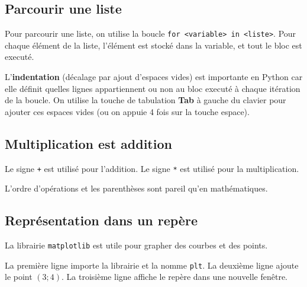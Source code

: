 \subsection*{Parcourir une liste}

\begin{multicols}{2}
	Pour parcourir une liste, on utilise la boucle \texttt{for <variable> in <liste>}.
	Pour chaque élément de la liste, l'élément est stocké dans la variable, et tout le bloc est executé.
	
	\columnbreak
	\centering
	\begin{minipage}{.3\textwidth}
	\end{minipage}
\end{multicols}

L'\textbf{indentation} (décalage par ajout d'espaces vides) est importante en Python car elle définit quelles lignes appartiennent ou non au bloc executé à chaque itération de la boucle.
On utilise la touche de tabulation \textbf{Tab} à gauche du clavier pour ajouter ces espaces vides (ou on appuie 4 fois sur la touche espace).

\subsection*{Multiplication est addition}

\begin{multicols}{2}
	Le signe \texttt{+} est utilisé pour l'addition.
	Le signe \texttt{*} est utilisé pour la multiplication.
	
	L'ordre d'opérations et les parenthèses sont pareil qu'en mathématiques.
	
	\columnbreak
	\centering
	\begin{minipage}{.1\textwidth}
	\end{minipage}
\end{multicols}

\newpage

\subsection*{Représentation dans un repère}

La librairie \texttt{matplotlib} est utile pour grapher des courbes et des points.

\begin{multicols}{2}
	La première ligne importe la librairie et la nomme \texttt{plt}.
	La deuxième ligne ajoute le point $(3 ; 4)$.
	La troisième ligne affiche le repère dans une nouvelle fenêtre.
	
	\columnbreak
	\centering
	\begin{minipage}{.3\textwidth}
	\end{minipage}
\end{multicols}

